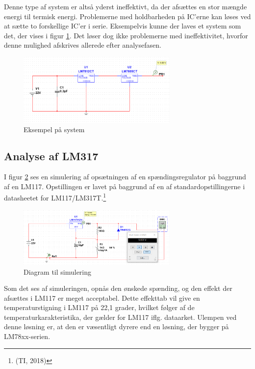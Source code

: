 Denne type af system er altså yderst ineffektivt, da der afsættes en stor mængde energi til termisk energi. Problemerne med holdbarheden på IC’erne kan løses ved at sætte to forskellige IC’er i serie. Eksempelvis kunne der laves et system som det, der vises i figur \ref{fig:j2}. Det løser dog ikke problemerne med ineffektivitet, hvorfor denne mulighed afskrives allerede efter analysefasen.

\begin{figure}[h]
  \centering
  \includegraphics[width=0.7\textwidth]{./figurer/j2.png}
  \caption{Eksempel på system}
  \label{fig:j2}
\end{figure}

\subsection{Analyse af LM317 }
\label{sec:analyse-af-lm317}

I figur \ref{fig:j3} ses en simulering af opsætningen af en spændingsregulator på baggrund af en LM117. Opstillingen er lavet på baggrund af en af standardopstillingerne i datasheetet for LM117/LM317T.\footnote{(TI, 2018)}

\begin{figure}[h]
  \centering
  \includegraphics[width=0.7\textwidth]{./figurer/j3.png}
  \caption{Diagram til simulering}
  \label{fig:j3}
\end{figure}

Som det ses af simuleringen, opnås den ønskede spænding, og den effekt der afsættes i LM117 er meget acceptabel. Dette effekttab vil give en temperaturstigning i LM117 på 22,1 grader, hvilket følger af de temperaturkarakteristika, der gælder for LM117 iflg. dataarket. Ulempen ved denne løsning er, at den er væsentligt dyrere end en løsning, der bygger på LM78xx-serien.

